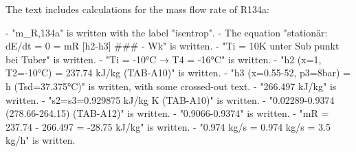The text includes calculations for the mass flow rate of R134a:  

- "m_R,134a" is written with the label "isentrop".  
- The equation "stationär: dE/dt = 0 = mR [h2-h3] ### - Wk" is written.  
- "Ti = 10K unter Sub punkt bei Tuber" is written.  
- "Ti = -10°C → T4 = -16°C" is written.  
- "h2 (x=1, T2=-10°C) = 237.74 kJ/kg (TAB-A10)" is written.  
- "h3 (x=0.55-52, p3=8bar) = h (Tsd=37.375°C)" is written, with some crossed-out text.  
- "266.497 kJ/kg" is written.  
- "s2=s3=0.929875 kJ/kg K (TAB-A10)" is written.  
- "0.02289-0.9374 (278.66-264.15) (TAB-A12)" is written.  
- "0.9066-0.9374" is written.  
- "mR = 237.74 - 266.497 = -28.75 kJ/kg" is written.  
- "0.974 kg/s = 0.974 kg/s = 3.5 kg/h" is written.